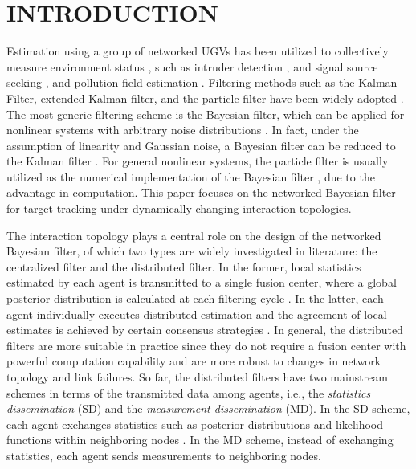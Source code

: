 \section{INTRODUCTION}
	
	Estimation using a group of networked UGVs has been utilized to collectively measure environment status \cite{hedrick2011tools}, such as intruder detection \cite{chamberland2007wireless}, and signal source seeking \cite{atanasov2015distributed}, and pollution field estimation \cite{madhag2017distributed}. 
	Filtering methods such as the Kalman Filter, extended Kalman filter, and the particle filter have been widely adopted \cite{thrun2005probabilistic}.
	The most generic filtering scheme is the Bayesian filter, which can be applied for nonlinear systems with arbitrary noise distributions \cite{bandyopadhyay2014distributed,julian2012distributed}.
	In fact, under the assumption of linearity and Gaussian noise, a Bayesian filter can be reduced to the Kalman filter \cite{chen2003bayesian}.
	For general nonlinear systems, the particle filter is usually utilized as the numerical implementation of the Bayesian filter \cite{chen2003bayesian}, due to the advantage in computation.
	This paper focuses on the networked Bayesian filter for target tracking under dynamically changing interaction topologies.
	
	The interaction topology plays a central role on the design of the networked Bayesian filter, of which two types are widely investigated in literature: the centralized filter and the distributed filter.
	In the former, local statistics estimated by each agent is transmitted to a single fusion center, where a global posterior distribution is calculated at each filtering cycle \cite{zuo2006bandwidth,vemula2006target}. 
	In the latter, each agent individually executes distributed estimation and the agreement of local estimates is achieved by certain consensus strategies \cite{jadbabaie2003coordination,ren2005consensus,olfati2007consensus}.
	In general, the distributed filters are more suitable in practice since they do not require a fusion center with powerful computation capability and are more robust to changes in network topology and link failures. 
	So far, the distributed filters have two mainstream schemes in terms of the transmitted data among agents, i.e., the \textit{statistics dissemination} (SD) and the \textit{measurement dissemination} (MD). 
	In the SD scheme, each agent exchanges statistics such as posterior distributions and likelihood functions within neighboring nodes \cite{hlinka2013distributed}. 
	In the MD scheme, instead of exchanging statistics, each agent sends measurements to neighboring nodes. 
	
